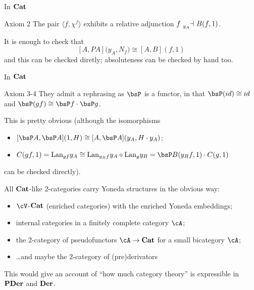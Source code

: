 \documentclass{beamer}
\begin{document}
\begin{frame}{In $\mathbf{Cat}$}
	\begin{block}{Axiom 2}
		The pair $\langle f, \chi^f\rangle$ exhibits a relative adjunction $f\reladjL{y_A} B(f,1)$.
	\end{block}
	\pause
	It is enough to check that
	\[
		[A,PA]\big( y_A, N_f \big) \cong [A,B](f,1)
	\]
	and this can be checked diretly; absoluteness can be checked by hand too.
\end{frame}
\begin{frame}{In $\mathbf{Cat}$}
	\begin{block}{Axiom 3-4}
		They admit a rephrasing as $\bsP$ is a functor, in that $\bsP(id)\cong id$ and $\bsP(gf)\cong \bsP f\crc\bsP g$.
	\end{block}
	\pause
	\bigskip
	This is pretty obvious (although the isomorphisms
	\medskip
	\begin{itemize}
		\item[3)] $[\bsP A,\bsP A](1, H)\cong [A,\bsP A](y_A,H\crc y_A)$;
		\item[4)] $C(gf,1)=\Lan_{gf}y_A \cong \Lan_{y_B f}y_A \circ \Lan_g y_B = \bsP B(y_Bf,1)\crc C(g,1)$
	\end{itemize}
	\medskip
	can be checked directly).
\end{frame}
\begin{frame}
	All $\mathbf{Cat}$-like 2-categories carry Yoneda structures in the obvious way:
	\begin{itemize}
		\item $\cV$-$\mathbf{Cat}$ (enriched categories) with the enriched Yoneda embeddings;
		\item internal categories in a finitely complete category $\cA$;
		\item the 2-category of pseudofunctors $\cA\to \Cat$ for a small bicategory $\cA$;
		\item \dots and maybe the 2-category of (pre)derivators
	\end{itemize}
	\medskip
	This would give an account of ``how much category theory'' is expressible in $\bf PDer$ and $\bf Der$.
\end{frame}
\end{document}
